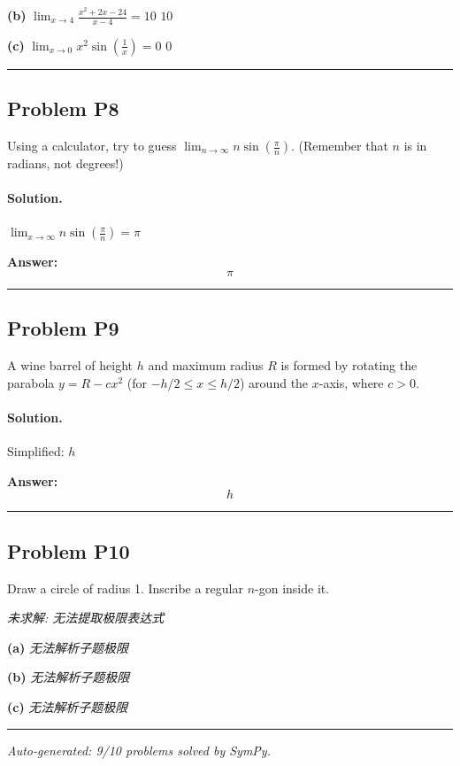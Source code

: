 \documentclass[12pt, a4paper]{article}
\newcommand{\problem}[1]{\subsection*{Problem #1}}
\newcommand{\solution}{\paragraph{Solution.}}
\begin{document}
\textbf{(b)}
$\lim_{x \to 4} \frac{x^{2} + 2 x - 24}{x - 4} = 10$
$\boxed{10}$

\textbf{(c)}
$\lim_{x \to 0} x^{2} \sin{\left(\frac{1}{x} \right)} = 0$
$\boxed{0}$

\vspace{1em}
\hrule
\vspace{1em}

\problem{P8}

Using a calculator, try to guess $\lim_{n \to \infty} n \sin\left(\frac{\pi}{n}\right)$. (Remember that $n$ is in radians, not degrees!)

\solution

$\lim_{x \to \infty} n \sin{\left(\frac{\pi}{n} \right)} = \pi$

\textbf{Answer:}
\[\boxed{\pi}\]

\vspace{1em}
\hrule
\vspace{1em}

\problem{P9}

A wine barrel of height $h$ and maximum radius $R$ is formed by rotating the parabola $y = R - cx^2$ (for $-h/2 \le x \le h/2$) around the $x$-axis, where $c > 0$.

\solution

Simplified: $h$

\textbf{Answer:}
\[\boxed{h}\]

\vspace{1em}
\hrule
\vspace{1em}

\problem{P10}

Draw a circle of radius 1. Inscribe a regular $n$-gon inside it.

\textit{\color{red} 未求解: 无法提取极限表达式}

\textbf{(a)}
\textit{\color{red} 无法解析子题极限}

\textbf{(b)}
\textit{\color{red} 无法解析子题极限}

\textbf{(c)}
\textit{\color{red} 无法解析子题极限}

\vspace{1em}
\hrule
\vspace{1em}


\vspace{2em}
\noindent\textit{Auto-generated: 9/10 problems solved by SymPy.}
\end{document}
